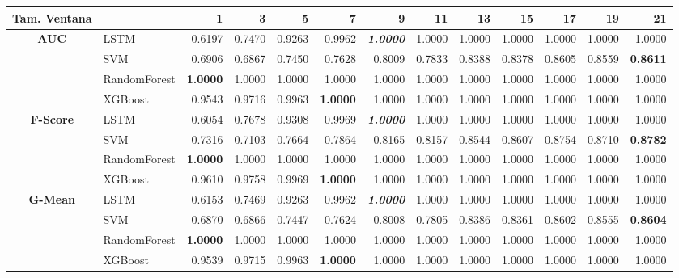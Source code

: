 \begin{table}[H]
	\centering
	\begin{adjustbox}{max width=14cm}
		\begin{tabular}{|c|l|r|r|r|r|r|r|r|r|r|r|r|}
			\hline
			\textbf{Tam. Ventana}&         &      1  &      3  &      5  &      7  &      9  &      11 &      13 &      15 &      17 &      19 &      21 \\
			\hline
			\textbf{AUC} &  LSTM &  0.6197 &  0.7470 &  0.9263 &  0.9962 & \textit{ \textbf{  1.0000 } } &  1.0000 &  1.0000 &  1.0000 &  1.0000 &  1.0000 &  1.0000 \\
			&  SVM &  0.6906 &  0.6867 &  0.7450 &  0.7628 &  0.8009 &  0.7833 &  0.8388 &  0.8378 &  0.8605 &  0.8559 & \textbf{  0.8611 } \\
			&  RandomForest & \textbf{  1.0000 } &  1.0000 &  1.0000 &  1.0000 &  1.0000 &  1.0000 &  1.0000 &  1.0000 &  1.0000 &  1.0000 &  1.0000 \\
			&  XGBoost &  0.9543 &  0.9716 &  0.9963 & \textbf{  1.0000 } &  1.0000 &  1.0000 &  1.0000 &  1.0000 &  1.0000 &  1.0000 &  1.0000 \\
			\hline
			\textbf{F-Score} &  LSTM &  0.6054 &  0.7678 &  0.9308 &  0.9969 & \textit{ \textbf{  1.0000 } } &  1.0000 &  1.0000 &  1.0000 &  1.0000 &  1.0000 &  1.0000 \\
			&  SVM &  0.7316 &  0.7103 &  0.7664 &  0.7864 &  0.8165 &  0.8157 &  0.8544 &  0.8607 &  0.8754 &  0.8710 & \textbf{  0.8782 } \\
			&  RandomForest & \textbf{  1.0000 } &  1.0000 &  1.0000 &  1.0000 &  1.0000 &  1.0000 &  1.0000 &  1.0000 &  1.0000 &  1.0000 &  1.0000 \\
			&  XGBoost &  0.9610 &  0.9758 &  0.9969 & \textbf{  1.0000 } &  1.0000 &  1.0000 &  1.0000 &  1.0000 &  1.0000 &  1.0000 &  1.0000 \\
			\hline
			\textbf{G-Mean} &  LSTM &  0.6153 &  0.7469 &  0.9263 &  0.9962 & \textit{ \textbf{  1.0000 } } &  1.0000 &  1.0000 &  1.0000 &  1.0000 &  1.0000 &  1.0000 \\
			&  SVM &  0.6870 &  0.6866 &  0.7447 &  0.7624 &  0.8008 &  0.7805 &  0.8386 &  0.8361 &  0.8602 &  0.8555 & \textbf{  0.8604 } \\
			&  RandomForest & \textbf{  1.0000 } &  1.0000 &  1.0000 &  1.0000 &  1.0000 &  1.0000 &  1.0000 &  1.0000 &  1.0000 &  1.0000 &  1.0000 \\
			&  XGBoost &  0.9539 &  0.9715 &  0.9963 & \textbf{  1.0000 } &  1.0000 &  1.0000 &  1.0000 &  1.0000 &  1.0000 &  1.0000 &  1.0000 \\

\end{tabular}
\end{adjustbox}
\end{table}
